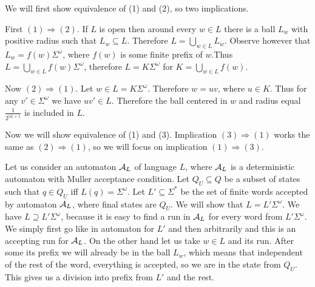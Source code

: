{
We will first show equivalence of (1) and (2), so two implications.

First $(1) \Rightarrow (2)$. If $L$ is open then around every $w \in L$ there is a ball $L_w$ with positive radius
such that $L_w \subseteq L$. Therefore $L = \bigcup_{w \in L} L_w$. Observe however that $L_w = f(w) \Sigma^\omega$,
where $f(w)$ is some finite prefix of $w$.Thus $L = \bigcup_{w \in L} f(w) \Sigma^\omega$, therefore $L = K \Sigma^\omega$
for $K = \bigcup_{w \in L} f(w)$.

Now $(2) \Rightarrow (1)$. Let $w \in L = K \Sigma^\omega$. Therefore $w = u v$, where $u \in K$.
Thus for any $v' \in \Sigma^\omega$ we have $u v' \in L$. Therefore the ball centered in $w$ and radius equal
$\frac{1}{2^{|u|+1}}$ is included in $L$.

Now we will show equivalence of (1) and (3). Implication $(3) \Rightarrow (1)$ works the same as
$(2) \Rightarrow (1)$, so we will focus on implication $(1) \Rightarrow (3)$.

Let us consider an automaton $\mathcal{A}_L$ of language $L$, where $\mathcal{A}_L$ is a deterministic
automaton with Muller acceptance condition.
Let $Q_U \subseteq Q$ be a subset of states such that $q \in Q_U$ iff $L(q) = \Sigma^\omega$.
Let $L' \subseteq \Sigma^*$ be the set of finite words accepted by automaton $\mathcal{A}_L$,
where final states are $Q_U$. We will show that $L = L' \Sigma^\omega$.
We have $L \supseteq L' \Sigma^\omega$, because it is easy to find a run in $\mathcal{A}_L$ for every word from $L' \Sigma^\omega$.
We simply first go like in automaton for $L'$ and then arbitrarily and this is an accepting run for $\mathcal{A}_L$.
On the other hand let us take $w \in L$ and its run. After some its prefix we will already be in the ball $L_w$,
which means that independent of the rest of the word, everything is accepted, so we are in the state from $Q_U$.
This gives us a division into prefix from $L'$ and the rest.
}



